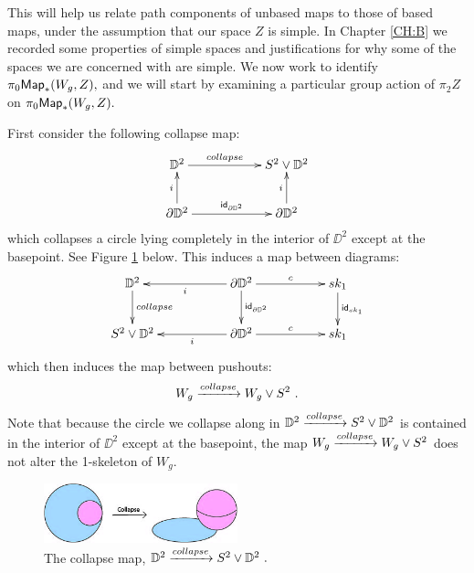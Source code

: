 This will help us relate path components of unbased maps to those of based maps, under the assumption that our space $Z$ is simple. In Chapter \ref{CH:B}  we recorded some properties of simple spaces and justifications for why some of the spaces we are concerned with are simple.
We now work to identify $\pi_{0}{\sf Map}_{\ast}(W_{g}, Z),$ and we will start by examining a particular group action of $\pi_{2}Z$ on $\pi_{0}{\sf Map}_{\ast}(W_{g}, Z).$

First consider the following collapse map:
\[
\xymatrix{
\DD^{2} \ar[rr]^-{collapse}
&&
S^{2} \vee \DD^{2} 
\\
\partial \DD^{2} \ar[u]^-{i} \ar[rr]^-{\id_{\partial \DD^{2}}}
&&
\partial \DD^{2} \ar[u]^-{i}
}
\]
which collapses a circle lying completely in the interior of $\DD^{2}$ except at the basepoint. See Figure \ref{f} below. This induces a map between diagrams:
\[
\xymatrix{
\DD^{2} \ar[d]^-{collapse}
&&
\partial \DD^{2} \ar[ll]^-{i} \ar[rr]^-{c} \ar[d]^-{\id_{\partial \DD^{2}}}
&&
sk_{1} \ar[d]^-{\id_{sk_{1}}}
\\
S^{2} \vee \DD^{2}  
&&
\partial \DD^{2} \ar[ll]^-{i} \ar[rr]^-{c}
&&
sk_{1}
}
\]
which then induces the map between pushouts:
\begin{equation}
W_{g} \xrightarrow{collapse} W_{g} \vee S^{2}~.
\end{equation}
Note that because the circle we collapse along in $\mathbb D^{2} \xrightarrow{collapse} S^{2} \vee \mathbb D^{2}$ is contained in the interior of $\DD^{2}$ except at the basepoint, the map $W_{g} \xrightarrow{collapse} 
W_{g} \vee S^{2}$ does not alter the 1-skeleton of $W_{g}$.



\begin{figure}[h]
\centering
\includegraphics[width=0.5\textwidth]{collapse}
\caption{The collapse map, $\mathbb D^{2} \xrightarrow{collapse} S^{2} \vee \mathbb D^{2}~.$}\label{f}
\end{figure}



